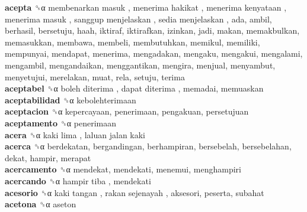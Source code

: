 \textbf{acepta} ␝α   membenarkan masuk ,  menerima hakikat ,  menerima kenyataan ,  menerima masuk ,  sanggup menjelaskan ,  sedia menjelaskan , ada, ambil, berhasil, bersetuju, haah, iktiraf, iktirafkan, izinkan, jadi, makan, memakbulkan, memasukkan, membawa, membeli, membutuhkan, memikul, memiliki, mempunyai, mendapat, menerima, mengadakan, mengaku, mengakui, mengalami, mengambil, mengandaikan, menggantikan, mengira, menjual, menyambut, menyetujui, merelakan, muat, rela, setuju, terima  \\
\textbf{aceptabel} ␝α   boleh diterima ,  dapat diterima , memadai, memuaskan  \\
\textbf{aceptabilidad} ␝α  kebolehterimaan  \\
\textbf{aceptacion} ␝α  kepercayaan, penerimaan, pengakuan, persetujuan  \\
\textbf{aceptamento} ␝α  penerimaan  \\
\textbf{acera} ␝α   kaki lima ,  laluan jalan kaki   \\
\textbf{acerca} ␝α  berdekatan, bergandingan, berhampiran, bersebelah, bersebelahan, dekat, hampir, merapat  \\
\textbf{acercamento} ␝α  mendekat, mendekati, menemui, menghampiri  \\
\textbf{acercando} ␝α   hampir tiba , mendekati  \\
\textbf{acesorio} ␝α   kaki tangan ,  rakan sejenayah , aksesori, peserta, subahat  \\
\textbf{acetona} ␝α  aseton  \\
